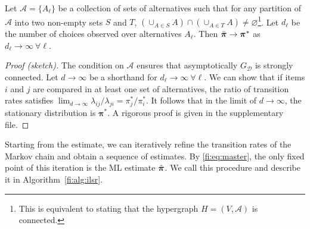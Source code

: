 \begin{theorem}
\label{fi:thm:consistency}
Let $\mathcal{A} = \{ A_\ell \}$ be a collection of sets of alternatives such that for any partition of $\mathcal{A}$ into two non-empty sets $S$ and $T$, $\left( \cup_{A \in S} A \right) \cap \left( \cup_{A \in T} A \right) \ne \varnothing$\footnote{
This is equivalent to stating that the hypergraph $H = (V, \mathcal{A})$ is connected.
}.
Let $d_\ell$ be the number of choices observed over alternatives $A_\ell$.
Then $\bar{\bm{\pi}} \to \bm{\pi}^*$ as $d_\ell \to \infty \ \forall \ell$.
\end{theorem}

\vspace{-0.3cm}
\begin{proof}[Proof (sketch)]
The condition on $\mathcal{A}$ ensures that asymptotically $G_{\mathcal{D}}$ is strongly connected.
Let $d \to \infty$ be a shorthand for $d_\ell \to \infty \ \forall \ell$.
We can show that if items $i$ and $j$ are compared in at least one set of alternatives, the ratio of transition rates satisfies $\lim_{d \to \infty} \lambda_{ij} / \lambda_{ji} = \pi^*_j / \pi^*_i$.
It follows that in the limit of $d \to \infty$, the stationary distribution is $\bm{\pi}^*$.
A rigorous proof is given in the supplementary file.
\end{proof}

Starting from the \LSR{} estimate, we can iteratively refine the transition rates of the Markov chain and obtain a sequence of estimates.
By \eqref{fi:eq:master}, the only fixed point of this iteration is the ML estimate $\hat{\bm{\pi}}$.
We call this procedure \ILSR{} and describe it in Algorithm~\ref{fi:alg:ilsr}.


